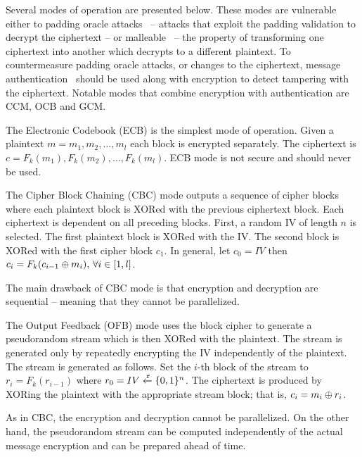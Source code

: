 Several modes of operation are presented below. These modes are vulnerable either to padding oracle attacks~\cite{padding_attacks} -- attacks that exploit the padding validation to decrypt the ciphertext -- or malleable~\cite{malleability} -- the property of transforming one ciphertext into another which decrypts to a different plaintext. To countermeasure padding oracle attacks, or changes to the ciphertext, message authentication~\cite{Katz:2014:IMC:2700550} should be used along with encryption to detect tampering with the ciphertext. Notable modes that combine encryption with authentication are CCM, OCB and GCM.

\label{preliminaries:sym:modes:ecb}

The Electronic Codebook (ECB) is the simplest mode of operation. Given a plaintext $m = m_1, m_2, \dots, m_l$ each block is encrypted separately. The ciphertext is $c = F_k(m_1), F_k(m_2), \dots, F_k(m_l)$. ECB mode is not secure and should never be used.

\label{preliminaries:sym:modes:cbc}

The Cipher Block Chaining (CBC) mode outputs a sequence of cipher blocks where each plaintext block is XORed with the previous ciphertext block. Each ciphertext is dependent on all preceding blocks. First, a random IV of length $n$ is selected. The first plaintext block is XORed with the IV. The second block is XORed with the first cipher block $c_1$. In general, let $c_0 = IV$ then $c_i = F_k(c_{i-1} \oplus m_i) \mbox{, } \forall i \in [1, l]$.

The main drawback of CBC mode is that encryption and decryption are sequential -- meaning that they cannot be parallelized.

\label{preliminaries:sym:modes:ofb}

The Output Feedback (OFB) mode uses the block cipher to generate a pseudorandom stream which is then XORed with the plaintext. The stream is generated only by repeatedly encrypting the IV independently of the plaintext. The stream is generated as follows. Set the $i$-th block of the stream to $r_i = F_k(r_{i-1})$ where $r_0 = IV \xleftarrow{\mathtt{r}}{\{ 0, 1 \}^{n}}$. The ciphertext is produced by XORing the plaintext with the appropriate stream block; that is, $c_i = m_i \oplus r_i$.

As in CBC, the encryption and decryption cannot be parallelized. On the other hand, the pseudorandom stream can be computed independently of the actual message encryption and can be prepared ahead of time.

